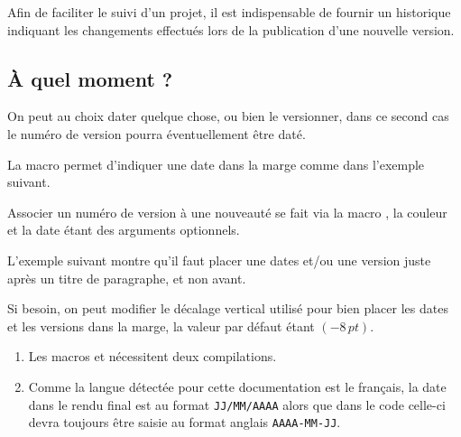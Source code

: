 Afin de faciliter le suivi d'un projet, il est indispensable de fournir un historique indiquant les changements effectués lors de la publication d'une nouvelle version.



\subsection{À quel moment ?}
\label{tutodoc-changes-when}

On peut au choix dater quelque chose, ou bien le versionner, dans ce second cas le numéro de version pourra éventuellement être daté.


\begin{tdocexa}
    La macro  permet d'indiquer une date dans la marge comme dans l'exemple suivant.

\end{tdocexa}


\begin{tdocexa}
    Associer un numéro de version à une nouveauté se fait via la macro , la couleur et la date étant des arguments optionnels.

\end{tdocexa}


\begin{tdocexa}
	L'exemple suivant montre qu'il faut placer une dates et/ou une version juste après un titre de paragraphe, et non avant.

\end{tdocexa}


\begin{tdocexa}
	Si besoin, on peut modifier le décalage vertical utilisé pour bien placer les dates et les versions dans la marge, la valeur par défaut étant $(-8\,\mathit{pt})$.

\end{tdocexa}


\begin{tdocimp}
    \begin{enumerate}[wide]
        \item Les macros  et  nécessitent deux compilations.

        \item Comme la langue détectée pour cette documentation est le français, la date dans le rendu final est au format \texttt{JJ/MM/AAAA} alors que dans le code celle-ci devra toujours être saisie au format anglais \texttt{AAAA-MM-JJ}.
    \end{enumerate}
\end{tdocimp}


